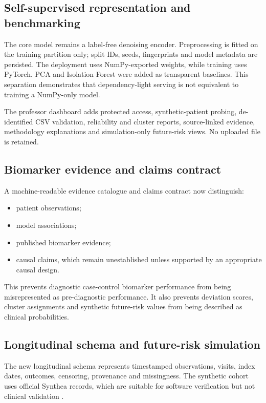 \documentclass[11pt,a4paper]{article}
\begin{document}
\subsection{Self-supervised representation and benchmarking}

The core model remains a label-free denoising encoder. Preprocessing is fitted
on the training partition only; split IDs, seeds, fingerprints and model metadata
are persisted. The deployment uses NumPy-exported weights, while training uses
PyTorch. PCA and Isolation Forest were added as transparent baselines. This
separation demonstrates that dependency-light serving is not equivalent to
training a NumPy-only model.

The professor dashboard adds protected access, synthetic-patient probing,
de-identified CSV validation, reliability and cluster reports, source-linked
evidence, methodology explanations and simulation-only future-risk views. No
uploaded file is retained.

\subsection{Biomarker evidence and claims contract}

A machine-readable evidence catalogue and claims contract now distinguish:

\begin{itemize}
  \item patient observations;
  \item model associations;
  \item published biomarker evidence;
  \item causal claims, which remain unestablished unless supported by an
  appropriate causal design.
\end{itemize}

This prevents diagnostic case-control biomarker performance from being
misrepresented as pre-diagnostic performance. It also prevents deviation scores,
cluster assignments and synthetic future-risk values from being described as
clinical probabilities.

\subsection{Longitudinal schema and future-risk simulation}

The new longitudinal schema represents timestamped observations, visits, index
dates, outcomes, censoring, provenance and missingness. The synthetic cohort uses
official Synthea records, which are suitable for software verification but not
clinical validation \citep{walonoski2018,chen2019synthea}.
\end{document}
